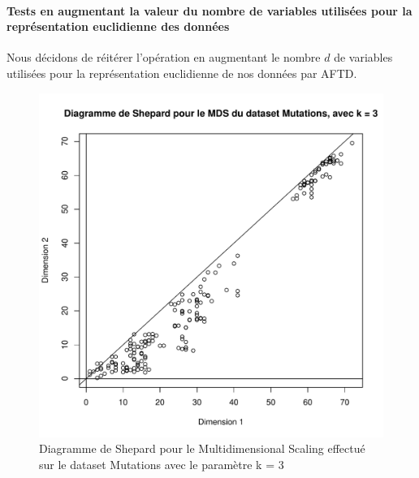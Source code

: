 \documentclass{report}
\begin{document}
\paragraph{Tests en augmentant la valeur du nombre de variables utilisées pour la représentation euclidienne des données}
Nous décidons de réitérer l'opération en augmentant le nombre $d$ de variables utilisées pour la représentation euclidienne de nos données par AFTD.
\begin{figure}[ht!]
\begin{center}
    \includegraphics[width=\textwidth]{../plots/E1Q3_SHEP3m.pdf}
    \caption{Diagramme de Shepard pour le Multidimensional Scaling effectué sur le dataset Mutations avec le paramètre k = 3}
\end{center}
\end{figure}
\end{document}
